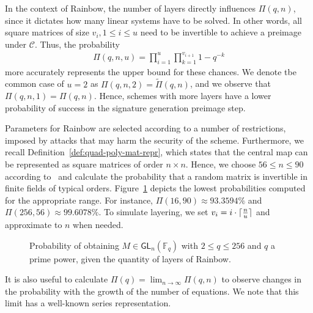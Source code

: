 \documentclass[12pt, a4paper, oneside]{memoir}
\DeclareMathOperator*{\argmin}{argmin}
\DeclarePairedDelimiter{\ceil}{\lceil}{\rceil}
\theoremstyle{definition}
\begin{document}
In the context of Rainbow, the number of layers directly influences $\Pi(q, n)$, since it dictates how many linear systems have to be solved. In other words, all square matrices of size $v_{i}, 1 \leq i \leq u$ need to be invertible to achieve a preimage under $\mathcal{C}$. Thus, the probability
\begin{align}
  \Pi(q, n, u) = \prod_{i = 1}^{u} \prod_{k = 1}^{v_{i + 1}} 1 - q^{-k}
\end{align}
more accurately represents the upper bound for these chances. We denote tbe common case of $u = 2$ as $\Pi(q, n, 2) = \widetilde{\Pi}(q, n)$, and we observe that $\Pi(q, n, 1) = \Pi(q, n)$. Hence, schemes with more layers have a lower probability of success in the signature generation preimage step.

Parameters for Rainbow are selected according to a number of restrictions, imposed by attacks that may harm the security of the scheme. Furthermore, we recall Definition~\ref{def:quad-poly-mat-repr}, which states that the central map can be represented as square matrices of order $n \times n$. Hence, we choose $56 \leq n \leq 90$ according to~\cite[Tabs.~6.4,~6.8,~6.13]{Petzoldt:201307} and calculate the probability that a random matrix is invertible in finite fields of typical orders. Figure~\ref{fig:prob-inv} depicts the lowest probabilities computed for the appropriate range. For instance, $\Pi(16, 90) \approx 93.3594\%$ and $\Pi(256, 56) \approx 99.6078\%$. To simulate layering, we set $v_{i} = i \cdot \ceil{\frac{n}{u}}$ and approximate to $n$ when needed.

\begin{figure}[htbp]
  \subfloat[
    $\argmin_{56 \leq n \leq 90}$ of $\Pi(q, n)$
    and $\widetilde{\Pi}(q, n)$.\label{fig:prob-inv-normal-size}
  ]{
  }
  \caption{Probability of obtaining $M \in \mathsf{GL}_{n}(\mathbb{F}_{q})$
    with $2 \leq q \leq 256$ and $q$ a prime power, given the
    quantity of layers of Rainbow.}\label{fig:prob-inv}
\end{figure}

It is also useful to calculate $\Pi(q) = \lim_{n \to \infty} \Pi(q, n)$ to observe changes in the probability with the growth of the number of equations. We note that this limit has a well-known series representation.
\end{document}

